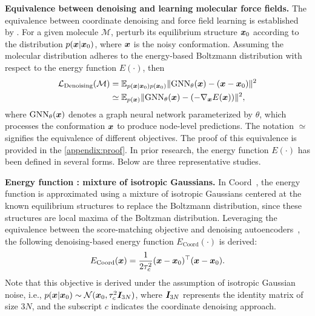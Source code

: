 \textbf{Equivalence between denoising and learning molecular force fields.}
The equivalence between coordinate denoising and force field learning is established by \cite{Coord}.
For a given molecule $\mathcal{M}$, perturb its equilibrium structure ${\bm{x}}_0$ according to the distribution $p({\bm{x}}|{\bm{x}}_0)$, where ${\bm{x}}$ is the noisy conformation. Assuming the molecular distribution adheres to the energy-based Boltzmann distribution with respect to the energy function $E(\cdot)$, then
\begin{equation}
\begin{aligned}
\mathcal{L}_{\text{Denoising}}(\mathcal{M}) &= \mathbb{E}_{p({\bm{x}}|{\bm{x}}_0)p({\bm{x}}_0)} \| \text{GNN}_\theta({\bm{x}}) - ({\bm{x}} - {\bm{x}}_0) \|^2 \\
&\simeq \mathbb{E}_{p({\bm{x}})} \| \text{GNN}_\theta({\bm{x}}) - (-\nabla_{{\bm{x}}} E({\bm{x}})) \|^2,
\end{aligned}
\end{equation}
where $\text{GNN}_{\theta}({\bm{x}})$ denotes a graph neural network parameterized by $\theta$, which processes the conformation ${\bm{x}}$ to produce node-level predictions. The notation $\simeq$ signifies the equivalence of different objectives. 
The proof of this equivalence is provided in the \cref{appendix:proof}.
In prior research, the energy function $E(\cdot)$ has been defined in several forms.
Below are three representative studies.

\textbf{Energy function : mixture of isotropic Gaussians.}
In Coord~\citep{Coord}, the energy function is approximated using a mixture of isotropic Gaussians centered at the known equilibrium structures to replace the Boltzmann distribution, since these structures are local maxima of the Boltzman distribution. Leveraging the equivalence between the score-matching objective and denoising autoencoders~\citep{ScoreMatching-DAE}, the following denoising-based energy function $E_{\text{Coord}}(\cdot)$ is derived:
\begin{equation}
E_{\text{Coord}}({\bm{x}}) = \frac{1}{2 \tau_c^2} ({\bm{x}} - {\bm{x}}_0)^\top ({\bm{x}} - {\bm{x}}_0).
\label{eq:coord}
\end{equation}
Note that this objective is derived under the assumption of isotropic Gaussian noise, i.e., $p({\bm{x}}|{\bm{x}}_0) \sim \mathcal{N}({\bm{x}}_0, \tau_c^2 {\bm{I}}_{3N})$, where ${\bm{I}}_{3N}$ represents the identity matrix of size $3N$, and the subscript $c$ indicates the coordinate denoising approach.

